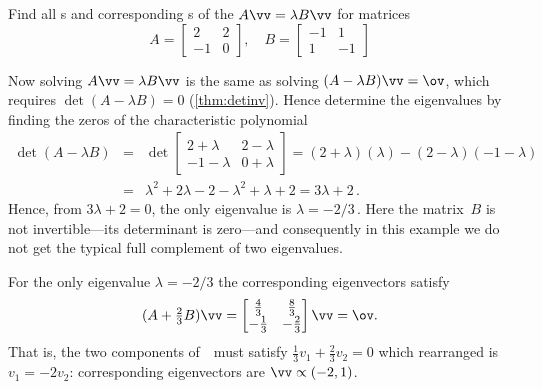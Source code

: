 \begin{example} 
Find all s and corresponding s of the  \(A\vv=\lambda B\vv\) for matrices
\begin{equation*}
A=\begin{bmatrix} 2&2\\-1&0 \end{bmatrix},\quad
B=\begin{bmatrix} -1&1\\1&-1 \end{bmatrix}
\end{equation*}
\begin{solution} 
Now solving \(A\vv=\lambda B\vv\) is the same as solving \((A-\lambda B)\vv=\ov\), which requires \(\det(A-\lambda B)=0\) (\cref{thm:detinv}).
Hence determine the eigenvalues by finding the zeros of the characteristic polynomial
\begin{eqnarray*}
\det(A-\lambda B)
&=&\det\begin{bmatrix} 2+\lambda&2-\lambda\\-1-\lambda&0+\lambda \end{bmatrix}
=(2+\lambda)(\lambda)-(2-\lambda)(-1-\lambda)
\\&=&\lambda^2+2\lambda-2-\lambda^2+\lambda+2
=3\lambda+2\,.
\end{eqnarray*}
Hence, from \(3\lambda+2=0\), the only eigenvalue is \(\lambda=-2/3\)\,.
Here the matrix~\(B\) is not invertible---its determinant is zero---and consequently in this example we do not get the typical full complement of two eigenvalues.

For the only eigenvalue \(\lambda=-2/3\) the corresponding eigenvectors satisfy
\begin{equation*}
(A+\tfrac23B)\vv=\begin{bmatrix} \tfrac43&\tfrac83\\-\tfrac13&-\tfrac23 \end{bmatrix}\vv=\ov.
\end{equation*}
That is, the two components of~\vv\ must satisfy \(\tfrac13v_1+\tfrac23v_2=0\) which rearranged is \(v_1=-2v_2\): corresponding eigenvectors are \(\vv\propto(-2,1)\).
\end{solution}
\end{example}







